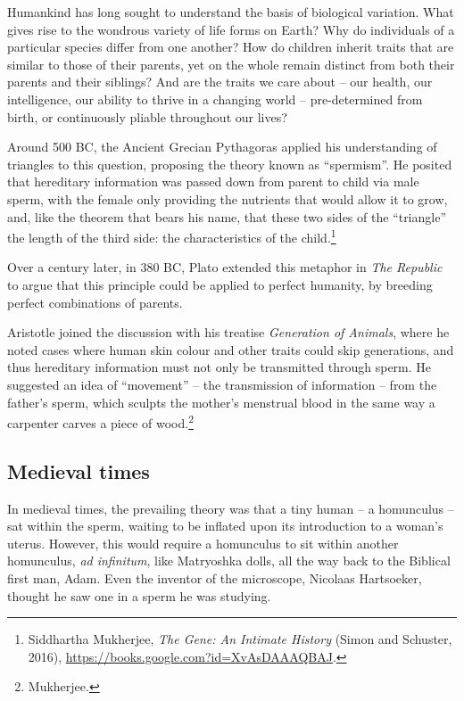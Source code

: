 \documentclass[
  9pt,
]{book}
\begin{document}
Humankind has long sought to understand the basis of biological variation. What gives rise to the wondrous variety of life forms on Earth? Why do individuals of a particular species differ from one another? How do children inherit traits that are similar to those of their parents, yet on the whole remain distinct from both their parents and their siblings? And are the traits we care about -- our health, our intelligence, our ability to thrive in a changing world -- pre-determined from birth, or continuously pliable throughout our lives?

Around 500 BC, the Ancient Grecian Pythagoras applied his understanding of triangles to this question, proposing the theory known as ``spermism''. He posited that hereditary information was passed down from parent to child via male sperm, with the female only providing the nutrients that would allow it to grow, and, like the theorem that bears his name, that these two sides of the ``triangle'' the length of the third side: the characteristics of the child.\footnote{Siddhartha Mukherjee, \emph{The {Gene}: {An Intimate History}} ({Simon and Schuster}, 2016), \url{https://books.google.com?id=XvAsDAAAQBAJ}.}

Over a century later, in 380 BC, Plato extended this metaphor in \emph{The Republic} to argue that this principle could be applied to perfect humanity, by breeding perfect combinations of parents.

Aristotle joined the discussion with his treatise \emph{Generation of Animals}, where he noted cases where human skin colour and other traits could skip generations, and thus hereditary information must not only be transmitted through sperm. He suggested an idea of ``movement'' -- the transmission of information -- from the father's sperm, which sculpts the mother's menstrual blood in the same way a carpenter carves a piece of wood.\footnote{Mukherjee.}

\hypertarget{medieval-times}{%
\subsection{Medieval times}\label{medieval-times}}

In medieval times, the prevailing theory was that a tiny human -- a homunculus -- sat within the sperm, waiting to be inflated upon its introduction to a woman's uterus. However, this would require a homunculus to sit within another homunculus, \emph{ad infinitum}, like Matryoshka dolls, all the way back to the Biblical first man, Adam. Even the inventor of the microscope, Nicolaas Hartsoeker, thought he saw one in a sperm he was studying.
\end{document}
